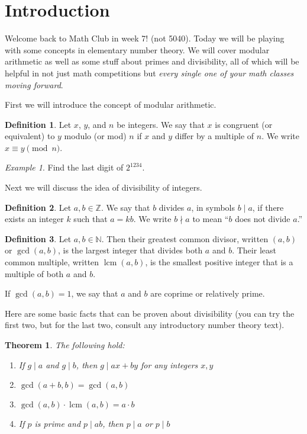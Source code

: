 \documentclass{article}
\newtheorem{theorem}{Theorem}[section]
\theoremstyle{definition}
\newtheorem{definition}{Definition}[section]
\theoremstyle{remark}
\newtheorem{example}{Example}[definition]
\DeclareMathOperator{\lcm}{lcm}
\newcommand{\NN}{\mathbb{N}}
\newcommand{\ZZ}{\mathbb{Z}}
\begin{document}
\section{Introduction}

    Welcome back to Math Club in week 7! (not 5040). 
    Today we will be playing with some concepts in elementary number theory. 
    We will cover modular arithmetic as well as some stuff about primes and divisibility, all of which will be helpful in not just math competitions but \textit{every single one of your math classes moving forward}. 

    First we will introduce the concept of modular arithmetic.

    \begin{definition}
        Let \(x\), \(y\), and \(n\) be integers. 
        We say that \(x\) is congruent (or equivalent) to \(y\) modulo (or mod) \(n\) if \(x\) and \(y\) differ by a multiple of \(n\). 
        We write \(x\equiv y\pmod{n}\).
    \end{definition}

    \begin{example}
        Find the last digit of \(2^{1234}\).
    \end{example}

    Next we will discuss the idea of divisibility of integers.

    \begin{definition}
        Let \(a,b\in\ZZ\). 
        We say that $b$ divides $a$, in symbols $b \mid a$, if there exists an integer $k$ such that $a=kb$. We write $b\nmid a$ to mean ``$b$ does not divide $a$.''
    \end{definition}

    \begin{definition}
        Let \(a,b\in\NN\). 
        Then their greatest common divisor, written \((a,b)\) or \(\gcd(a,b)\), is the largest integer that divides both \(a\) and \(b\). 
        Their least common multiple, written \(\lcm(a,b)\), is the smallest positive integer that is a multiple of both \(a\) and \(b\).

        If \(\gcd(a,b)=1\), we say that \(a\) and \(b\) are coprime or relatively prime.
    \end{definition}
    
    Here are some basic facts that can be proven about divisibility (you can try the first two, but for the last two, consult any introductory number theory text).
    
    \begin{theorem}
        The following hold:
        \begin{enumerate}
            \item If \(g\mid a\) and \(g\mid b\), then \(g\mid ax+by\) for any integers \(x,y\)
            \item \(\gcd(a+b,b)=\gcd(a,b)\)
            \item \(\gcd(a,b)\cdot\lcm(a,b)=a\cdot b\)
            \item If \(p\) is prime and \(p\mid ab\), then \(p\mid a\) or \(p\mid b\)
        \end{enumerate}
    \end{theorem}
    
\end{document}
